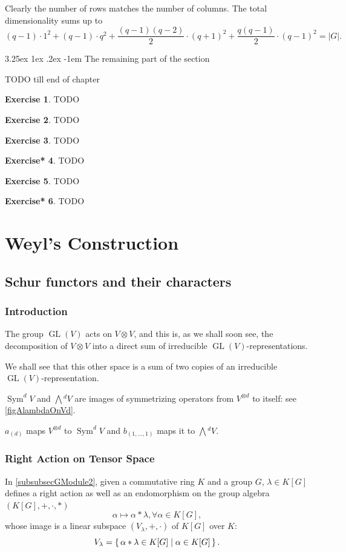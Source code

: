 \documentclass[12pt, letterpaper]{article}
\makeatletter
\newcommand{\GL}{\operatorname{GL}}
\newcommand{\Sym}{\operatorname{Sym}}
\newcommand{\ext}[1]{\bigwedge\!^{#1}}
\newcommand{\red}[1]{{\color{red} #1}}
\newcommand{\card}[1]{\left\lvert #1 \right\rvert}
\renewcommand\paragraph{\@startsection{paragraph}{4}{\z@}%
	{3.25ex \@plus1ex \@minus.2ex}%
	{-1em}%
	{\normalfont\normalsize\bfseries}}
\theoremstyle{definition}
\theoremstyle{remark}
\theoremstyle{definition}
\newtheorem{exe}{Exercise}[section]
\newtheorem{exe*}[exe]{Exercise*}
\theoremstyle{plain}
\numberwithin{equation}{section}
\makeatother
\begin{document}
	Clearly the number of rows matches the number of columns.
	The total dimensionality sums up to
	\[(q-1) \cdot 1^2+(q-1)\cdot q^2+ \frac{(q-1)(q-2)}{2}\cdot (q+1)^2+\frac{q(q-1)}{2}\cdot(q-1)^2=\card{G}. \]
	
	\paragraph{The remaining part of the section}
	
	\red{TODO till end of chapter}
	\begin{exe}
		\red{TODO}
	\end{exe}
	\begin{exe}
		\red{TODO}
	\end{exe}
	\begin{exe}
	\red{TODO}
	\end{exe}
	\begin{exe*}
	\red{TODO}
	\end{exe*}
	\begin{exe}
	\red{TODO}
	\end{exe}
	\begin{exe*}
	\red{TODO}
	\end{exe*}
	\section{Weyl's Construction}
	\subsection{Schur functors and their characters}
	
	\subsubsection{Introduction}
	\red{The group $\GL(V)$ acts on $V \otimes V$, and this is,
		as we shall soon see, the decomposition of $V \otimes V$ into a direct sum of irreducible $\GL(V)$-representations.}
	
	\red{We shall see that this other space is a sum of two copies of an irreducible
	$\GL(V)$-representation.}

	$\Sym^dV$ and $\ext{d}V$ are images of symmetrizing 
	operators from $V^{\otimes d}$ to itself:
	see \autoref{figAlambdaOnVd}.
	
	$a_{(d)}$ maps $V^{\otimes d}$ to $\Sym^dV$ and
	$b_{(1,\dots,1)}$ maps it to $\ext{d}V$.

	\subsubsection{Right Action on Tensor Space}
	In \autoref{subsubsecGModule2}, given a commutative ring $K$ and a group $G$,
	$\lambda\in K[G]$ defines a right action as well as an endomorphism on the group algebra $(K[G],+,\cdot,*)$
	\[ \alpha \mapsto \alpha* \lambda,\forall \alpha\in K[G], \]
	whose image is a linear subspace $(V_\lambda,+,\cdot)$ of $K[G]$ over $K$:
	\[V_\lambda=\set{\alpha*\lambda\in K[G]|\alpha \in K[G] }. \]
	
\end{document}
